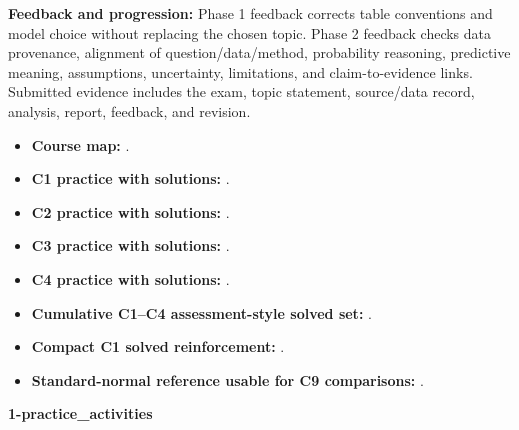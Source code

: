 \documentclass[10pt,letterpaper]{article}
\newcommand{\labelled}[2]{\textbf{#1:} #2\par}
\newcommand{\plansection}[1]{\Needspace{8\baselineskip}\par\vspace{8pt}{\large\bfseries #1\par}\vspace{3pt}}
\newcommand{\plansubsection}[1]{\Needspace{7\baselineskip}\par\vspace{5pt}{\normalsize\bfseries #1\par}\vspace{1pt}}
\begin{document}
	\labelled{Feedback and progression}{Phase 1 feedback corrects table conventions and model choice without replacing the chosen topic. Phase 2 feedback checks data provenance, alignment of question/data/method, probability reasoning, predictive meaning, assumptions, uncertainty, limitations, and claim-to-evidence links. Submitted evidence includes the exam, topic statement, source/data record, analysis, report, feedback, and revision.}
	
	\plansection{References and Material Status}
	\plansubsection{Verified current Term 1 sources}
	\begin{itemize}
		\item \textbf{Course map:} \textnormal{}.
		\item \textbf{C1 practice with solutions:} \textnormal{}.
		\item \textbf{C2 practice with solutions:} \textnormal{}.
		\item \textbf{C3 practice with solutions:} \textnormal{}.
		\item \textbf{C4 practice with solutions:} \textnormal{}.
		\item \textbf{Cumulative C1--C4 assessment-style solved set:} \textnormal{}.
		\item \textbf{Compact C1 solved reinforcement:} \textnormal{}.
		\item \textbf{Standard-normal reference usable for C9 comparisons:} \textnormal{}.
	\end{itemize}
	\plansubsection{PDF documents}
	\textbf{1-practice\_activities}
\end{document}
